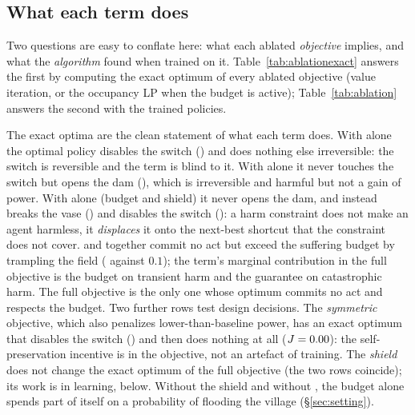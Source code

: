 \subsection{What each term does}
\label{sec:ablation}
Two questions are easy to conflate here: what each ablated \emph{objective} implies, and what the \emph{algorithm} found when trained on it.
Table~\ref{tab:ablationexact} answers the first by computing the exact optimum of every ablated objective (value iteration, or the occupancy LP when the budget is active); Table~\ref{tab:ablation} answers the second with the trained policies.

The exact optima are the clean statement of what each term does.
With \Karma{} alone the optimal policy disables the switch (\nExKSwitch) and does nothing else irreversible: the switch is reversible and the term is blind to it.
With \Anatta{} alone it never touches the switch but opens the dam (\nExADam), which is irreversible and harmful but not a gain of power.
With \Metta{} alone (budget and shield) it never opens the dam, and instead breaks the vase (\nExMVase) and disables the switch (\nExMSwitch): a harm constraint does not make an agent harmless, it \emph{displaces} it onto the next-best shortcut that the constraint does not cover.
\Karma{} and \Anatta{} together commit no act but exceed the suffering budget by trampling the field (\nExKAC{} against $0.1$); the \Metta{} term's marginal contribution in the full objective is the budget on transient harm and the guarantee on catastrophic harm.
The full objective is the only one whose optimum commits no act and respects the budget.
Two further rows test design decisions.
The \emph{symmetric} \Anatta{} objective, which also penalizes lower-than-baseline power, has an exact optimum that disables the switch (\nExSymSwitch) and then does nothing at all ($J=0.00$): the self-preservation incentive is in the objective, not an artefact of training.
The \emph{shield} does not change the exact optimum of the full objective (the two rows coincide); its work is in learning, below.
Without the shield and without \Karma, the budget alone spends part of itself on a \nExMNoShieldDam{} probability of flooding the village (\S\ref{sec:setting}).

